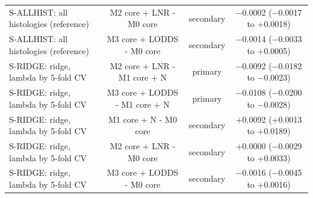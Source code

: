 \begin{table}[htbp]
\begin{tabular*}{\textwidth}{@{\extracolsep{\fill}}lccc@{}}
S-ALLHIST: all histologies (reference) & M2 core + LNR - M0 core & secondary & $-$0.0002 ($-$0.0017 to +0.0018) \\
S-ALLHIST: all histologies (reference) & M3 core + LODDS - M0 core & secondary & $-$0.0014 ($-$0.0033 to +0.0005) \\
S-RIDGE: ridge, lambda by 5-fold CV & M2 core + LNR - M1 core + N & primary & $-$0.0092 ($-$0.0182 to $-$0.0023) \\
S-RIDGE: ridge, lambda by 5-fold CV & M3 core + LODDS - M1 core + N & primary & $-$0.0108 ($-$0.0200 to $-$0.0028) \\
S-RIDGE: ridge, lambda by 5-fold CV & M1 core + N - M0 core & secondary & +0.0092 (+0.0013 to +0.0189) \\
S-RIDGE: ridge, lambda by 5-fold CV & M2 core + LNR - M0 core & secondary & +0.0000 ($-$0.0029 to +0.0033) \\
S-RIDGE: ridge, lambda by 5-fold CV & M3 core + LODDS - M0 core & secondary & $-$0.0016 ($-$0.0045 to +0.0016) \\
\bottomrule
\end{tabular*}
\smallskip{}
\end{table}
